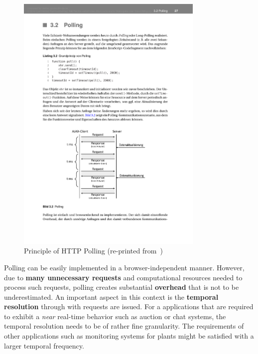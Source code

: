 \documentclass[a4paper, justified, notoc]{tufte-handout} %
\begin{document}
%
\begin{figure}%
	\centering
  \includegraphics[width=0.8\textwidth]{./figures/polling.pdf}
  \caption{Principle of HTTP Polling (re-printed from~\citet{gorski:2015})}
  \label{fig:polling}
\end{figure}


Polling can be easily implemented in a browser-independent manner. However, due to \textbf{many unnecessary requests} and computational resources needed to process such requests, polling creates substantial \textbf{overhead} that is not to be underestimated. An important aspect in this context is the \textbf{temporal resolution} through with requests are issued. For a applications that are required to exhibit a \emph{near} real-time behavior such as auction or chat systems, the temporal resolution needs to be of rather fine granularity. The requirements of other applications such as monitoring systems for plants might be satisfied with a larger temporal frequency.
\end{document}
